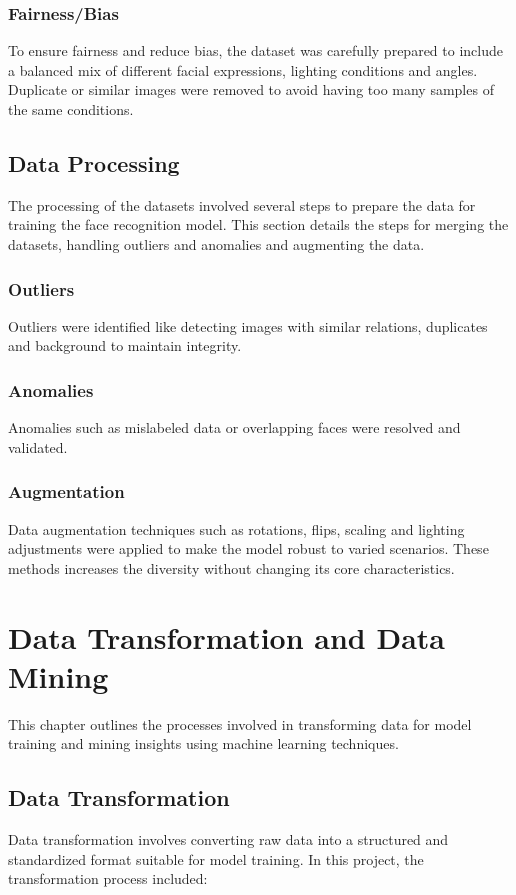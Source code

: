 \subsection{Fairness/Bias}
To ensure fairness and reduce bias, the dataset was carefully prepared to include a balanced mix of different facial expressions, lighting conditions and angles. Duplicate or similar images were removed to avoid having too many samples of the same conditions.

\section{Data Processing}
The processing of the datasets involved several steps to prepare the data for training the face recognition model. This section details the steps for merging the datasets, handling outliers and anomalies and augmenting the data. \cite{KDD:2000}


\subsection{Outliers}
Outliers were identified like detecting images with similar relations, duplicates and background to maintain integrity.

\subsection{Anomalies}
Anomalies such as mislabeled data or overlapping faces were resolved and validated.

\subsection{Augmentation}
Data augmentation techniques such as rotations, flips, scaling and lighting adjustments were applied to make the model robust to varied scenarios. These methods increases the diversity without changing its core characteristics.

\chapter{Data Transformation and Data Mining}
This chapter outlines the processes involved in transforming data for model training and mining insights using machine learning techniques. \cite{IEEE:1997}

\section{Data Transformation}
Data transformation involves converting raw data into a structured and standardized format suitable for model training. In this project, the transformation process included:

